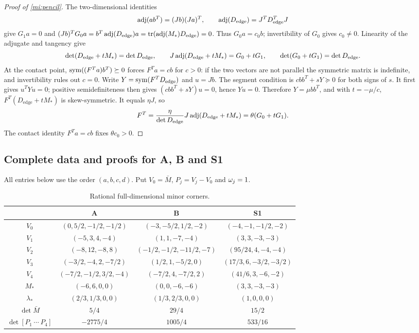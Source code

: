 \begin{proof}[Proof of \cref{mi:pencil}]\label{mi:pencil-proof}
The two-dimensional identities
\[
 \operatorname{adj}(ab^T)=(Jb)(Ja)^T,\qquad \operatorname{adj}(D_{\mathrm{edge}})=J^TD_{\mathrm{edge}}^TJ
\]
give $G_1a=0$ and
$(Jb)^TG_0a=b^T\operatorname{adj}(D_{\mathrm{edge}})a=\operatorname{tr}(\operatorname{adj}(M_*)D_{\mathrm{edge}})=0$.
Thus $G_0a=c_0b$; invertibility of $G_0$ gives $c_0\ne0$.
Linearity of the adjugate and tangency give
\[
 \det(D_{\mathrm{edge}}+tM_*)=\det D_{\mathrm{edge}},
 \qquad J\operatorname{adj}(D_{\mathrm{edge}}+tM_*)=G_0+tG_1,
 \qquad\det(G_0+tG_1)=\det D_{\mathrm{edge}}.
\]
At the contact point, $\operatorname{sym}((F^Ta)b^T)\succeq0$ forces $F^Ta=cb$ for
$c>0$: if the two vectors are not parallel the symmetric matrix is
indefinite, and invertibility rules out $c=0$.
Write $Y=\operatorname{sym}(F^TD_{\mathrm{edge}})$ and $u=Jb$.
The segment condition is $cbb^T+sY\succeq0$ for both signs of $s$.
It first gives $u^TYu=0$; positive semidefiniteness then gives
$(cbb^T+sY)u=0$, hence $Yu=0$.
Therefore $Y=\mu bb^T$, and with $t=-\mu/c$,
$F^T(D_{\mathrm{edge}}+tM_*)$ is skew-symmetric. It equals $\eta J$, so
\[
 F^T=\frac{\eta}{\det D_{\mathrm{edge}}}J\operatorname{adj}(D_{\mathrm{edge}}+tM_*)
     =\theta(G_0+tG_1).
\]
The contact identity $F^Ta=cb$ fixes $\theta c_0>0$.
\end{proof}

\subsection{Complete data and proofs for A, B and S1}

All entries below use the order $(a,b,c,d)$. Put $V_0=\bar M$,
$P_j=V_j-V_0$ and $\omega_j=1$.
\begin{table}[htbp]
\centering\small
\begin{tabular}{c c c c}
\toprule
 & A & B & S1\\
\midrule
$V_0$ & $(0,5/2,-1/2,-1/2)$ & $(-3,-5/2,1/2,-2)$ & $(-4,-1,-1/2,-2)$\\
$V_1$ & $(-5,3,4,-4)$ & $(1,1,-7,-4)$ & $(3,3,-3,-3)$\\
$V_2$ & $(-8,12,-8,8)$ & $(-1/2,-1/2,-11/2,-7)$ & $(95/24,4,-4,-4)$\\
$V_3$ & $(-3/2,-4,2,-7/2)$ & $(1/2,1,-5/2,0)$ & $(17/3,6,-3/2,-3/2)$\\
$V_4$ & $(-7/2,-1/2,3/2,-4)$ & $(-7/2,4,-7/2,2)$ & $(41/6,3,-6,-2)$\\
$M_*$ & $(-6,6,0,0)$ & $(0,0,-6,-6)$ & $(3,3,-3,-3)$\\
$\lambda_*$ & $(2/3,1/3,0,0)$ & $(1/3,2/3,0,0)$ & $(1,0,0,0)$\\
$\det\bar M$ & $5/4$ & $29/4$ & $15/2$\\
$\det[P_1\ \cdots\ P_4]$ & $-2775/4$ & $1005/4$ & $533/16$\\
\bottomrule
\end{tabular}
\caption{Rational full-dimensional minor corners.}\label{mi:example-data}
\end{table}

